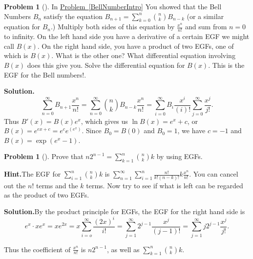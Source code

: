\documentclass[10pt,]{book}
\theoremstyle{plain}
\theoremstyle{definition}
\newtheorem{activity}[project]{Problem}
\theoremstyle{definition}
\numberwithin{equation}{chapter}
\begin{document}
\begin{activity}[]\label{BellNumbersEGF}
In \hyperref[BellNumberIntro]{Problem~\ref{BellNumberIntro}} You showed that the Bell Numbers \(B_n\) satisfy the equation \(B_{n+1} =
\sum_{k=0}^{n} \binom{n}{k}B_{n-k}\) (or a similar equation for \(B_n\).) Multiply both sides of this equation by \(\frac{x^n}{n!}\) and sum from \(n=0\) to infinity. On the left hand side you have a derivative of a certain EGF we might call \(B(x)\). On the right hand side, you have a product of two EGFs, one of which is \(B(x)\). What is the other one? What differential equation involving \(B(x)\) does this give you. Solve the differential equation for \(B(x)\). This is the EGF for the Bell numbers!.%
\par\medskip\noindent%
\textbf{Solution.}\quad %
\begin{equation*}
\sum_{n=0}^\infty B_{n+1}\frac{x^n}{n!} = \sum_{n=0}^\infty\binom{n}{k}B_{n-k}\frac{x^n}{n!} =\sum_{i=0}^\infty B_{i}\frac{x^{i}}{(i)!}\sum_{j=0}^\infty \frac{x^j}{j!}\text{.}
\end{equation*}
Thus \(B'(x) = B(x)e^x\), which gives us \(\ln B(x) = e^x+c\), or \(B(x) =
e^{ex+c} =e^ce^{(e^x)}\). Since \(B_0=B(0)\) and \(B_0=1\), we have \(c=-1\) and \(B(x) = \exp(e^x-1)\).%
\end{activity}
\begin{activity}[]\label{activity-407}
Prove that \(n2^{n-1} = \sum_{k=1}^n \binom{n}{k}k\) by using EGFs.%
\par\medskip\noindent%
\textbf{Hint.}\quad The EGF for \(\sum_{i=1}^n\binom{n}{k}k\) is \(\sum_{n=1}^\infty \sum_{i=1}^n \frac{n!}{k!(n-k)!}k\frac{x^n}{n!}\).  You can cancel out the \(n!\) terms and the \(k\) terms.  Now try to see if what is left can be regarded as the product of two EGFs.%
\par\medskip\noindent%
\textbf{Solution.}\quad By the product principle for EGFs, the EGF for the right hand side is%
\begin{equation*}
e^x\cdot xe^x =xe^{2x}=x\sum_{i=o}^\infty \frac{(2x)^i}{i!} =
\sum_{j=1}^\infty 2^{j-1}\frac{x^j}{(j-1)!}=\sum_{j=1}^\infty
j2^{j-1}\frac{x^j}{j!}.
\end{equation*}
%
\par
Thus the coefficient of \(\frac{x^n}{n!}\) is \(n2^{n-1}\), as well as \(\sum_{k=1}^n \binom{n}{k}k\).%
\end{activity}
\end{document}
